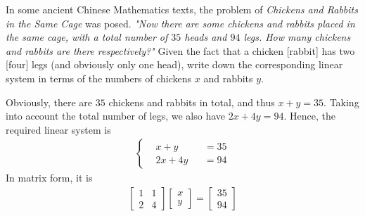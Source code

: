 \begin{Exercise}
\label{ex:animals}
In some ancient Chinese Mathematics texts, the problem of \textit{Chickens and Rabbits in the Same Cage} was posed. \textit{"Now there are some chickens and rabbits placed in the same cage, with a total number of $35$ heads and $94$ legs. How many chickens and rabbits are there respectively?"} Given the fact that a chicken [rabbit] has two [four] legs (and obviously only one head), write down the corresponding linear system in terms of the numbers of chickens $x$ and rabbits $y$.
\end{Exercise}
\begin{Answer}
Obviously, there are $35$ chickens and rabbits in total, and thus $x + y = 35$. Taking into account the total number of legs, we also have $2x + 4y = 94$. Hence, the required linear system is
\begin{align*}
\left\{\begin{alignedat}{2}
&x + y& &= 35\\
&2x + 4y& &= 94
\end{alignedat}\right.  
\end{align*}
In matrix form, it is
\begin{align*}
\begin{bmatrix}
1 & 1 \\
2 & 4 
\end{bmatrix}
\begin{bmatrix}
x \\
y
\end{bmatrix}
=
\begin{bmatrix}
35 \\
94
\end{bmatrix}
\end{align*}
\end{Answer}